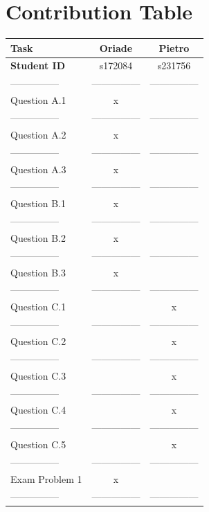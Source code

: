\documentclass[
]{article}
\begin{document}
\newpage

\hypertarget{contribution-table}{%
\section{Contribution Table}\label{contribution-table}}

\begin{longtable}[]{@{}lcc@{}}
\toprule\noalign{}
Task & Oriade & Pietro \\
\midrule\noalign{}
\endhead
\bottomrule\noalign{}
\endlastfoot
\textbf{Student ID} & s172084 & s231756 \\
--------------- & --------------- & --------------- \\
Question A.1 & x & \\
--------------- & --------------- & --------------- \\
Question A.2 & x & \\
--------------- & --------------- & --------------- \\
Question A.3 & x & \\
--------------- & --------------- & --------------- \\
Question B.1 & x & \\
--------------- & --------------- & --------------- \\
Question B.2 & x & \\
--------------- & --------------- & --------------- \\
Question B.3 & x & \\
--------------- & --------------- & --------------- \\
Question C.1 & & x \\
--------------- & --------------- & --------------- \\
Question C.2 & & x \\
--------------- & --------------- & --------------- \\
Question C.3 & & x \\
--------------- & --------------- & --------------- \\
Question C.4 & & x \\
--------------- & --------------- & --------------- \\
Question C.5 & & x \\
--------------- & --------------- & --------------- \\
Exam Problem 1 & x & \\
--------------- & --------------- & --------------- \\

\end{longtable}
\end{document}
